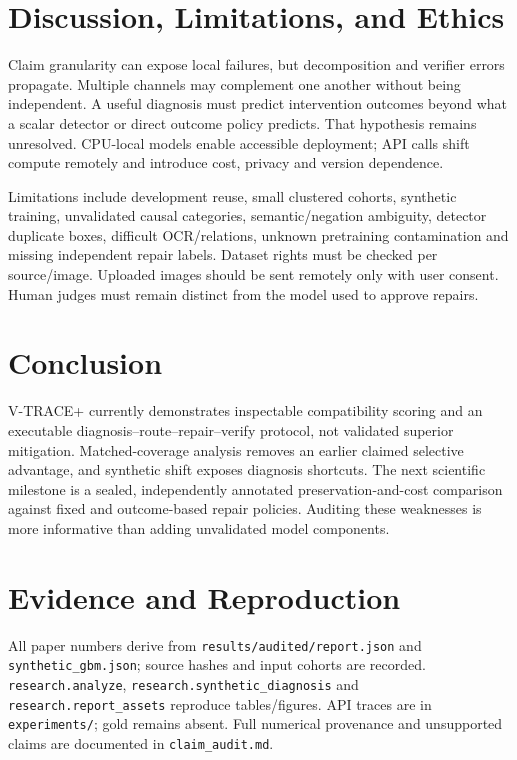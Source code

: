 \documentclass[conference]{IEEEtran}
\begin{document}
\section{Discussion, Limitations, and Ethics}
Claim granularity can expose local failures, but decomposition and verifier
errors propagate. Multiple channels may complement one another without being
independent. A useful diagnosis must predict intervention outcomes beyond
what a scalar detector or direct outcome policy predicts. That hypothesis
remains unresolved. CPU-local models enable accessible deployment; API calls
shift compute remotely and introduce cost, privacy and version dependence.

Limitations include development reuse, small clustered cohorts, synthetic
training, unvalidated causal categories, semantic/negation ambiguity, detector
duplicate boxes, difficult OCR/relations, unknown pretraining contamination
and missing independent repair labels. Dataset rights must be checked per
source/image. Uploaded images should be sent remotely only with user consent.
Human judges must remain distinct from the model used to approve repairs.

\section{Conclusion}
V-TRACE+ currently demonstrates inspectable compatibility scoring and an
executable diagnosis--route--repair--verify protocol, not validated superior
mitigation. Matched-coverage analysis removes an earlier claimed selective
advantage, and synthetic shift exposes diagnosis shortcuts. The next scientific
milestone is a sealed, independently annotated preservation-and-cost comparison
against fixed and outcome-based repair policies. Auditing these weaknesses is
more informative than adding unvalidated model components.

\section*{Evidence and Reproduction}
All paper numbers derive from \texttt{results/audited/report.json} and
\texttt{synthetic\_gbm.json}; source hashes and input cohorts are recorded.
\texttt{research.analyze}, \texttt{research.synthetic\_diagnosis} and
\texttt{research.report\_assets} reproduce tables/figures. API traces are in
\texttt{experiments/}; gold remains absent. Full numerical provenance and
unsupported claims are documented in \texttt{claim\_audit.md}.
\end{document}
